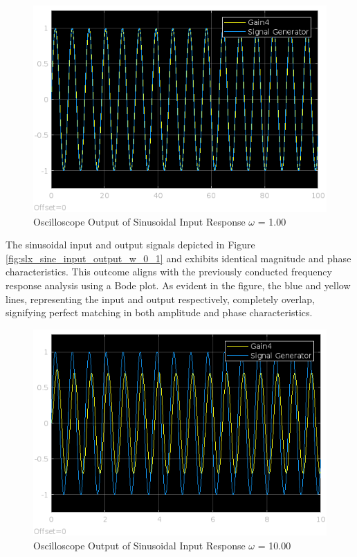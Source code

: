 \documentclass[12pt]{article}
\begin{document}
			\begin{figure}[H]
				\centering
				\includegraphics[width=1\linewidth]{"Code/Fig/sine_input_output_w_1.png"} 
				\caption{Oscilloscope Output of Sinusoidal Input Response $\omega$ = 1.00}
				\label{fig:slx_sine_input_output_w_1}
			\end{figure}
			The sinusoidal input and output signals depicted in Figure \ref{fig:slx_sine_input_output_w_0_1} and exhibits identical magnitude and phase characteristics. This outcome aligns with the previously conducted frequency response analysis using a Bode plot. As evident in the figure, the blue and yellow lines, representing the input and output respectively, completely overlap, signifying perfect matching in both amplitude and phase characteristics.
			\begin{figure}[H]
				\centering
				\includegraphics[width=1\linewidth]{"Code/Fig/sine_input_output_w_10.png"} 
				\caption{Oscilloscope Output of Sinusoidal Input Response $\omega$ = 10.00}
				\label{fig:slx_sine_input_output_w_10}
			\end{figure}
\end{document}
